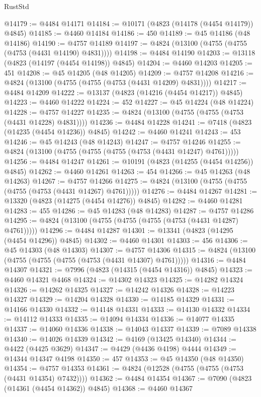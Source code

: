 \begin{lexlean}{RustStd}
\begin{coremodule}
@14179 := @4484 @14171
@14184 := @10171 (@4823 (@14178 (@4454 @14179)) @4845)
@14185 := @4460 @14184
@14186 := 450
@14189 := @45 @14186 (@48 @14186)
@14190 := @4757 @14189
@14197 := @4824 (@13100 (@4755 (@4755 (@4753 (@4431 @14190) @4831))))
@14198 := @4484 @14190
@14203 := @13118 (@4823 (@14197 (@4454 @14198)) @4845)
@14204 := @4460 @14203
@14205 := 451
@14208 := @45 @14205 (@48 @14205)
@14209 := @4757 @14208
@14216 := @4824 (@13100 (@4755 (@4755 (@4753 (@4431 @14209) @4831))))
@14217 := @4484 @14209
@14222 := @13137 (@4823 (@14216 (@4454 @14217)) @4845)
@14223 := @4460 @14222
@14224 := 452
@14227 := @45 @14224 (@48 @14224)
@14228 := @4757 @14227
@14235 := @4824 (@13100 (@4755 (@4755 (@4753 (@4431 @14228) @4831))))
@14236 := @4484 @14228
@14241 := @7418 (@4823 (@14235 (@4454 @14236)) @4845)
@14242 := @4460 @14241
@14243 := 453
@14246 := @45 @14243 (@48 @14243)
@14247 := @4757 @14246
@14255 := @4824 (@13100 (@4755 (@4755 (@4755 (@4753 (@4431 @14247) @4761)))))
@14256 := @4484 @14247
@14261 := @10191 (@4823 (@14255 (@4454 @14256)) @4845)
@14262 := @4460 @14261
@14263 := 454
@14266 := @45 @14263 (@48 @14263)
@14267 := @4757 @14266
@14275 := @4824 (@13100 (@4755 (@4755 (@4755 (@4753 (@4431 @14267) @4761)))))
@14276 := @4484 @14267
@14281 := @13320 (@4823 (@14275 (@4454 @14276)) @4845)
@14282 := @4460 @14281
@14283 := 455
@14286 := @45 @14283 (@48 @14283)
@14287 := @4757 @14286
@14295 := @4824 (@13100 (@4755 (@4755 (@4755 (@4753 (@4431 @14287) @4761)))))
@14296 := @4484 @14287
@14301 := @13341 (@4823 (@14295 (@4454 @14296)) @4845)
@14302 := @4460 @14301
@14303 := 456
@14306 := @45 @14303 (@48 @14303)
@14307 := @4757 @14306
@14315 := @4824 (@13100 (@4755 (@4755 (@4755 (@4753 (@4431 @14307) @4761)))))
@14316 := @4484 @14307
@14321 := @7996 (@4823 (@14315 (@4454 @14316)) @4845)
@14323 := @4460 @14321 @4468
@14324 := @14302 @14323
@14325 := @14282 @14324
@14326 := @14262 @14325
@14327 := @14242 @14326
@14328 := @14223 @14327
@14329 := @14204 @14328
@14330 := @14185 @14329
@14331 := @14166 @14330
@14332 := @14148 @14331
@14333 := @14130 @14332
@14334 := @14112 @14333
@14335 := @14094 @14334
@14336 := @14077 @14335
@14337 := @14060 @14336
@14338 := @14043 @14337
@14339 := @7089 @14338
@14340 := @14026 @14339
@14342 := @4169 (@13425 @14340)
@14344 := @4422 (@4425 @3629)
@14347 := @4429 (@4436 @4198) @4444
@14349 := @14344 @14347 @4198
@14350 := 457
@14353 := @45 @14350 (@48 @14350)
@14354 := @4757 @14353
@14361 := @4824 (@12528 (@4755 (@4755 (@4753 (@4431 @14354) @7432))))
@14362 := @4484 @14354
@14367 := @7090 (@4823 (@14361 (@4454 @14362)) @4845)
@14368 := @4460 @14367

\end{coremodule}
\end{lexlean}
